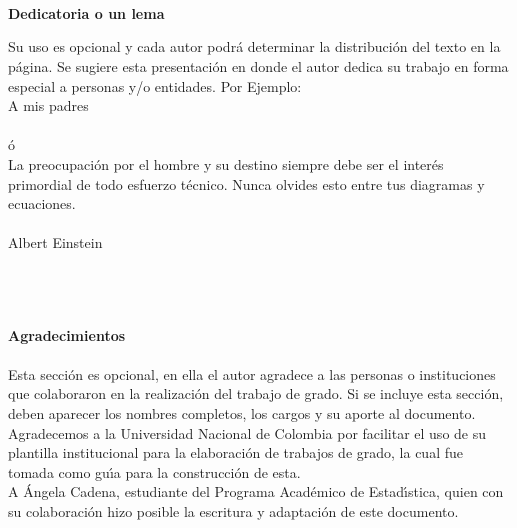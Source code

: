 \newpage

\thispagestyle{empty} \textbf{}\normalsize
\\\\\\
\textbf{Dedicatoria o un lema}\\[4.0cm]

\begin{flushright}
\begin{minipage}{8cm}
\noindent
\small
Su uso es opcional y cada autor podr\'{a} determinar la distribuci\'{o}n del texto en la p\'{a}gina. Se sugiere esta presentaci\'{o}n en donde el autor dedica su trabajo en forma especial a personas y/o entidades. Por Ejemplo:\\[1.0cm]
A mis padres\\[1.0cm]\\
\'{o}\\[1.0cm]
La preocupaci\'{o}n por el hombre y su destino siempre debe ser el inter\'{e}s primordial de todo esfuerzo t\'{e}cnico. Nunca olvides esto entre tus diagramas y ecuaciones.\\\\
Albert Einstein\\
\end{minipage}
\end{flushright}

\newpage{\pagestyle{empty}\cleardoublepage}

\newpage

\thispagestyle{empty} \textbf{}\normalsize
\\\\\\
\textbf{\LARGE Agradecimientos}\\\\
Esta secci\'{o}n es opcional, en ella el autor agradece a las personas o instituciones que colaboraron en la realizaci\'{o}n del trabajo de grado. Si se incluye esta secci\'{o}n, deben aparecer los nombres completos, los cargos y su aporte al documento.\\

Agradecemos a la Universidad Nacional de Colombia por facilitar el uso de su plantilla institucional para la elaboraci\'{o}n de trabajos de grado, la cual fue tomada como gu\'{\i}a para la construcci\'{o}n de esta.\\

A \'{A}ngela Cadena, estudiante del Programa Acad\'{e}mico de Estad\'{\i}stica, quien con su colaboraci\'{o}n hizo posible la escritura y adaptaci\'{o}n de este documento.


